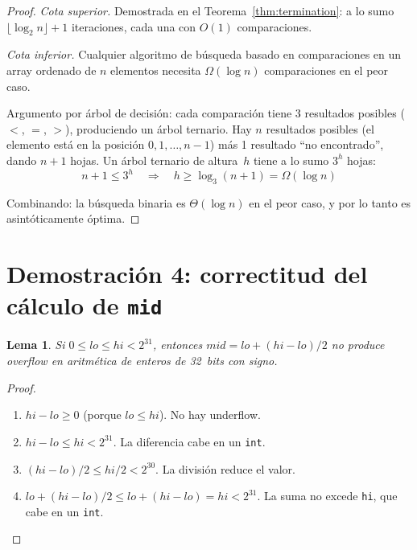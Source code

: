\documentclass[11pt, letterpaper]{article}
\theoremstyle{definition}
\theoremstyle{plain}
\newtheorem{lemma}[theorem]{Lema}
\theoremstyle{remark}
\begin{document}
\begin{proof}
\emph{Cota superior.} Demostrada en el Teorema~\ref{thm:termination}:
a lo sumo $\lfloor\log_2 n\rfloor + 1$ iteraciones, cada una con
$O(1)$ comparaciones.

\emph{Cota inferior.} Cualquier algoritmo de búsqueda basado en
comparaciones en un array ordenado de $n$ elementos necesita
$\Omega(\log n)$ comparaciones en el peor caso.

Argumento por árbol de decisión: cada comparación tiene 3 resultados
posibles ($<$, $=$, $>$), produciendo un árbol ternario. Hay $n$
resultados posibles (el elemento está en la posición $0, 1, \ldots,
n{-}1$) más 1 resultado ``no encontrado'', dando $n + 1$ hojas. Un
árbol ternario de altura~$h$ tiene a lo sumo $3^h$ hojas:
\[
  n + 1 \leq 3^h
  \quad\Longrightarrow\quad
  h \geq \log_3(n+1) = \Omega(\log n)
\]

Combinando: la búsqueda binaria es $\Theta(\log n)$ en el peor caso,
y por lo tanto es asintóticamente óptima.
\end{proof}

\section{Demostración 4: correctitud del cálculo de \texttt{mid}}

\begin{lemma}\label{lem:mid}
Si $0 \leq \mathit{lo} \leq \mathit{hi} < 2^{31}$, entonces
$\mathit{mid} = \mathit{lo} + (\mathit{hi} - \mathit{lo})/2$ no
produce overflow en aritmética de enteros de 32~bits con signo.
\end{lemma}

\begin{proof}
\begin{enumerate}
  \item $\mathit{hi} - \mathit{lo} \geq 0$ (porque
    $\mathit{lo} \leq \mathit{hi}$). No hay underflow.
  \item $\mathit{hi} - \mathit{lo} \leq \mathit{hi} < 2^{31}$. La
    diferencia cabe en un \texttt{int}.
  \item $(\mathit{hi} - \mathit{lo})/2 \leq \mathit{hi}/2 < 2^{30}$.
    La división reduce el valor.
  \item $\mathit{lo} + (\mathit{hi} - \mathit{lo})/2 \leq
    \mathit{lo} + (\mathit{hi} - \mathit{lo}) = \mathit{hi} < 2^{31}$.
    La suma no excede \texttt{hi}, que cabe en un \texttt{int}.
\end{enumerate}
\end{proof}
\end{document}
